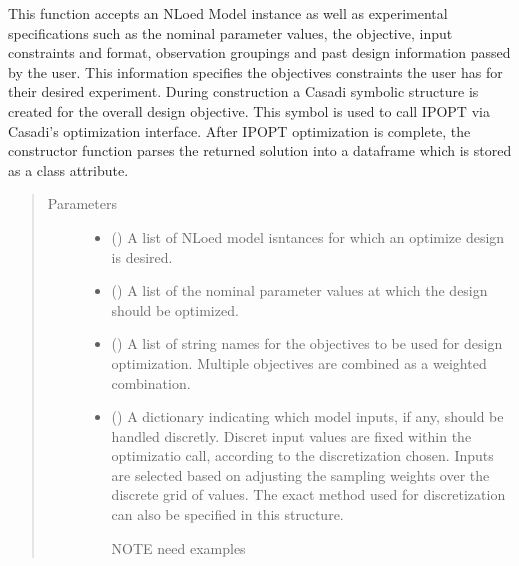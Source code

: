 \documentclass[letterpaper,10pt,english,openany,oneside]{sphinxmanual}
\begin{document}
\begin{fulllineitems}
\begin{fulllineitems}
This function accepts an NLoed Model instance as well as experimental specifications such as the
nominal parameter values, the objective, input constraints and format, observation groupings
and past design information passed by the user. This information specifies the objectives
constraints the user has for their desired experiment. During construction a Casadi
symbolic structure is created for the overall design objective. This symbol is used to call
IPOPT via Casadi’s optimization interface. After IPOPT optimization is complete, the constructor
function parses the returned solution into a dataframe which is stored as a class attribute.
\begin{quote}\begin{description}
\item[{Parameters}] \leavevmode\begin{itemize}
\item {} 
 () \textendash{} A list of NLoed model isntances for which an optimize design is
desired.

\item {} 
 () \textendash{} A list of the nominal parameter values at which the
design should be optimized.

\item {} 
 () \textendash{} A list of string names for the objectives to be used for
design optimization. Multiple objectives are combined as a weighted combination.

\item {} 
 (\sphinxstyleliteralemphasis{\sphinxupquote{, }}) \textendash{} 
A dictionary indicating which
model inputs, if any, should be handled discretly. Discret input values are
fixed within the optimizatio call, according to the discretization chosen. Inputs
are selected based on adjusting the sampling weights over the discrete grid of values.
The exact method used for discretization can also be specified in this structure.

NOTE\textendash{} need examples



\end{itemize}
\end{description}
\end{quote}
\end{fulllineitems}
\end{fulllineitems}
\end{document}
